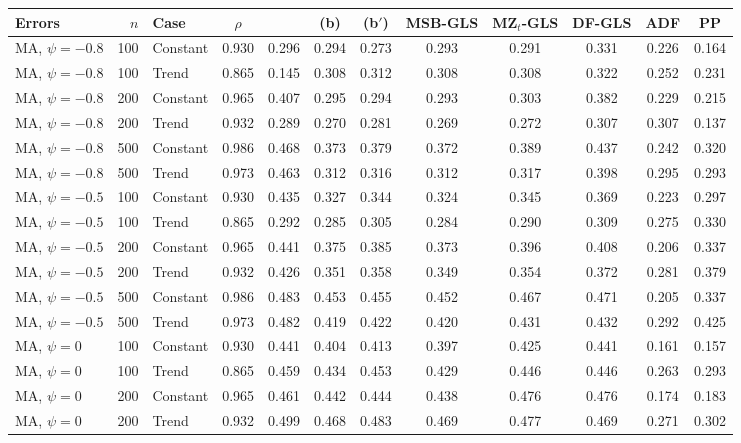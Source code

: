 \begin{tabular}{lrlccccccccc}
\toprule
Errors & $n$ & Case & $\rho$ & \RMGLS{} & (b) & (b$'$) & MSB-GLS & MZ$_t$-GLS & DF-GLS & ADF & PP \\
\midrule
MA, $\psi = -0.8$ & 100 & Constant & 0.930 & 0.296 & 0.294 & 0.273 & 0.293 & 0.291 & 0.331 & 0.226 & 0.164 \\
MA, $\psi = -0.8$ & 100 & Trend & 0.865 & 0.145 & 0.308 & 0.312 & 0.308 & 0.308 & 0.322 & 0.252 & 0.231 \\
MA, $\psi = -0.8$ & 200 & Constant & 0.965 & 0.407 & 0.295 & 0.294 & 0.293 & 0.303 & 0.382 & 0.229 & 0.215 \\
MA, $\psi = -0.8$ & 200 & Trend & 0.932 & 0.289 & 0.270 & 0.281 & 0.269 & 0.272 & 0.307 & 0.307 & 0.137 \\
MA, $\psi = -0.8$ & 500 & Constant & 0.986 & 0.468 & 0.373 & 0.379 & 0.372 & 0.389 & 0.437 & 0.242 & 0.320 \\
MA, $\psi = -0.8$ & 500 & Trend & 0.973 & 0.463 & 0.312 & 0.316 & 0.312 & 0.317 & 0.398 & 0.295 & 0.293 \\
\addlinespace
MA, $\psi = -0.5$ & 100 & Constant & 0.930 & 0.435 & 0.327 & 0.344 & 0.324 & 0.345 & 0.369 & 0.223 & 0.297 \\
MA, $\psi = -0.5$ & 100 & Trend & 0.865 & 0.292 & 0.285 & 0.305 & 0.284 & 0.290 & 0.309 & 0.275 & 0.330 \\
MA, $\psi = -0.5$ & 200 & Constant & 0.965 & 0.441 & 0.375 & 0.385 & 0.373 & 0.396 & 0.408 & 0.206 & 0.337 \\
MA, $\psi = -0.5$ & 200 & Trend & 0.932 & 0.426 & 0.351 & 0.358 & 0.349 & 0.354 & 0.372 & 0.281 & 0.379 \\
MA, $\psi = -0.5$ & 500 & Constant & 0.986 & 0.483 & 0.453 & 0.455 & 0.452 & 0.467 & 0.471 & 0.205 & 0.337 \\
MA, $\psi = -0.5$ & 500 & Trend & 0.973 & 0.482 & 0.419 & 0.422 & 0.420 & 0.431 & 0.432 & 0.292 & 0.425 \\
\addlinespace
MA, $\psi = 0$ & 100 & Constant & 0.930 & 0.441 & 0.404 & 0.413 & 0.397 & 0.425 & 0.441 & 0.161 & 0.157 \\
MA, $\psi = 0$ & 100 & Trend & 0.865 & 0.459 & 0.434 & 0.453 & 0.429 & 0.446 & 0.446 & 0.263 & 0.293 \\
MA, $\psi = 0$ & 200 & Constant & 0.965 & 0.461 & 0.442 & 0.444 & 0.438 & 0.476 & 0.476 & 0.174 & 0.183 \\
MA, $\psi = 0$ & 200 & Trend & 0.932 & 0.499 & 0.468 & 0.483 & 0.469 & 0.477 & 0.469 & 0.271 & 0.302 \\

\end{tabular}
